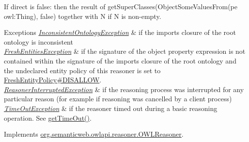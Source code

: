 If {\ttfamily direct} is {\ttfamily false}\-: then the result of {\ttfamily get\-Super\-Classes(Object\-Some\-Values\-From(pe owl\-:\-Thing), false)} together with {\ttfamily N} if {\ttfamily N} is non-\/empty.


\begin{DoxyExceptions}{Exceptions}
{\em \hyperlink{classorg_1_1semanticweb_1_1owlapi_1_1reasoner_1_1_inconsistent_ontology_exception}{Inconsistent\-Ontology\-Exception}} & if the imports closure of the root ontology is inconsistent \\
\hline
{\em \hyperlink{classorg_1_1semanticweb_1_1owlapi_1_1reasoner_1_1_fresh_entities_exception}{Fresh\-Entities\-Exception}} & if the signature of the object property expression is not contained within the signature of the imports closure of the root ontology and the undeclared entity policy of this reasoner is set to \hyperlink{enumorg_1_1semanticweb_1_1owlapi_1_1reasoner_1_1_fresh_entity_policy_a762eae6d5b2449d125311ecaabfdc8d0}{Fresh\-Entity\-Policy\#\-D\-I\-S\-A\-L\-L\-O\-W}. \\
\hline
{\em \hyperlink{classorg_1_1semanticweb_1_1owlapi_1_1reasoner_1_1_reasoner_interrupted_exception}{Reasoner\-Interrupted\-Exception}} & if the reasoning process was interrupted for any particular reason (for example if reasoning was cancelled by a client process) \\
\hline
{\em \hyperlink{classorg_1_1semanticweb_1_1owlapi_1_1reasoner_1_1_time_out_exception}{Time\-Out\-Exception}} & if the reasoner timed out during a basic reasoning operation. See \hyperlink{classorg_1_1semanticweb_1_1owlapi_1_1reasoner_1_1impl_1_1_o_w_l_reasoner_base_af55342eaaabb1b72dacfde7a181b93d2}{get\-Time\-Out()}. \\
\hline
\end{DoxyExceptions}


Implements \hyperlink{interfaceorg_1_1semanticweb_1_1owlapi_1_1reasoner_1_1_o_w_l_reasoner_a309f7047538443742247c73d3f5ce34a}{org.\-semanticweb.\-owlapi.\-reasoner.\-O\-W\-L\-Reasoner}.

